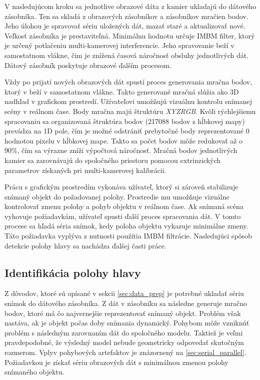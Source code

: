 V nasledujúcom kroku sa jednotlive obrazové dáta z kamier ukladajú do dátového zásobníka. Ten sa skladá z obrazových zásobníkov a zásobníkov mračien bodov. Jeho úlohou je spravovať sériu uložených dát, mazať staré a aktualizovať nové. Veľkosť zásobníka je prestaviteľná. Minimálnu hodnotu určuje IMBM filter, ktorý je určený potlačeniu multi-kamerovej interferencie. Jeho spravovanie beží v samostatnom vlákne, čim je znížená časová náročnosť obsluhy jednotlivých dát. Dátový zásobník poskytuje obrazové ďalším procesom. 

Vždy po prijatí nových obrazových dát spustí proces generovania mračna bodov, ktorý v beží v samostatnom vlákne. Takto generované mračná slúžia ako 3D nadhľad v grafickom prostredí. Užívateľovi umožňujú vizuálnu kontrolu snímanej scény v reálnom čase. Body mračna majú štruktúru \textit{XYZRGB}. Kvôli rýchlejšiemu spracovaniu sa organizovaná štruktúra bodov (217088 bodov z hĺbkovej mapy) prevádza na 1D pole, čím je možné odstrániť prebytočné body reprezentované 0 hodnotou pixelu v hĺbkovej mape. Takto sa počet bodov môže redukovať až o $90\%$, čím sa výrazne zníži výpočtová náročnosť. Mračná bodov jednotlivých kamier sa zarovnávajú do spoločného priestoru pomocou extrinzických parametrov získaných pri multi-kamerovej kalibrácii. 

Prácu s grafickým prostredím vykonáva užívateľ, ktorý si zároveň stabilizuje snímaný objekt do požadovanej polohy. Prostredie mu umožňuje vizuálne kontrolovať zmenu polohy a pohyb objektu v reálnom čase. Ak snímaná scéna vyhovuje požiadavkám, užívateľ spusti ďalší proces spracovania dát. V tomto procese sa hľadá séria snímok, kedy poloha objektu vykazuje minimálne zmeny. Táto požiadavka vyplýva z nutnosti použitia IMBM filtrácie. Nasledujúci spôsob detekcie polohy hlavy sa nachádza ďalšej časti práce. 


\subsection{Identifikácia polohy hlavy}

Z dôvodov, ktoré sú opísané v sekcii \ref{sec:data_prep} je potrebné ukladať sériu snímok do dátového zásobníka. Z dát v zásobníku sa následne generuje mračno bodov, ktoré má čo najvernejšie reprezentovať snímaný objekt. Problém však nastáva, ak je objekt počas doby snímania dynamický. Pohybom môže vzniknúť problém s následným zarovnaním dát do spoločného modelu. Taktiež je veľmi pravdepodobné, že výsledný model nebude geometricky odpovedať skutočným rozmerom. Vplyv pohybových artefaktov je znázornený na \ref{sec:serial_parallel}. Požiadavkou je získať sériu obrazových dát s minimálnou zmenou polohy snímaného objektu. \newline 

